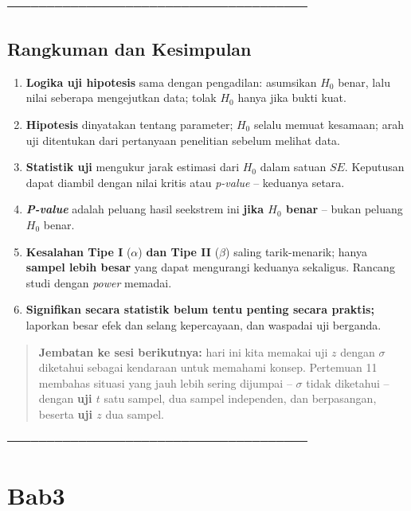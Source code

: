 \documentclass[
  indonesian,
  letterpaper,
]{book}
\begin{document}
──────────────────────────────────────

\section{Rangkuman dan Kesimpulan}\label{rangkuman-dan-kesimpulan-1}

\begin{enumerate}
\def\labelenumi{\arabic{enumi}.}
\item
  \textbf{Logika uji hipotesis} sama dengan pengadilan: asumsikan
  \(H_0\) benar, lalu nilai seberapa mengejutkan data; tolak \(H_0\)
  hanya jika bukti kuat.
\item
  \textbf{Hipotesis} dinyatakan tentang parameter; \(H_0\) selalu memuat
  kesamaan; arah uji ditentukan dari pertanyaan penelitian sebelum
  melihat data.
\item
  \textbf{Statistik uji} mengukur jarak estimasi dari \(H_0\) dalam
  satuan \(SE\). Keputusan dapat diambil dengan nilai kritis atau
  \emph{p-value} -- keduanya setara.
\item
  \textbf{\emph{P-value}} adalah peluang hasil seekstrem ini
  \textbf{jika \(H_0\) benar} -- bukan peluang \(H_0\) benar.
\item
  \textbf{Kesalahan Tipe I} (\(\alpha\)) \textbf{dan Tipe II}
  (\(\beta\)) saling tarik-menarik; hanya \textbf{sampel lebih besar}
  yang dapat mengurangi keduanya sekaligus. Rancang studi dengan
  \emph{power} memadai.
\item
  \textbf{Signifikan secara statistik belum tentu penting secara
  praktis;} laporkan besar efek dan selang kepercayaan, dan waspadai uji
  berganda.
\end{enumerate}

\begin{quote}
\textbf{Jembatan ke sesi berikutnya:} hari ini kita memakai uji \(z\)
dengan \(\sigma\) diketahui sebagai kendaraan untuk memahami konsep.
Pertemuan 11 membahas situasi yang jauh lebih sering dijumpai --
\(\sigma\) tidak diketahui -- dengan \textbf{uji \(t\)} satu sampel, dua
sampel independen, dan berpasangan, beserta \textbf{uji \(z\)} dua
sampel.
\end{quote}

──────────────────────────────────────


\chapter{Bab3}\label{bab3}
\end{document}
